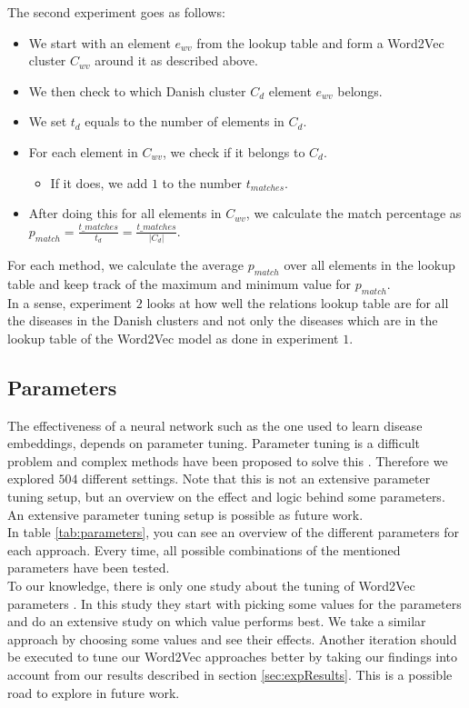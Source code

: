 \noindent The second experiment goes as follows:

\begin{itemize}

\item We start with an element $e_{wv}$ from the lookup table and form a Word2Vec cluster $C_{wv}$ around it as described above.
\item We then check to which Danish cluster $C_d$ element $e_{wv}$ belongs.
\item We set $t_{d}$ equals to the number of elements in $C_d$.
\item For each element in $C_{wv}$, we check if it belongs to $C_d$.
\begin{itemize}
\item If it does, we add $1$ to the number $t_{matches}$.
\end{itemize}
\item After doing this for all elements in $C_{wv}$, we calculate the match percentage as $p_{match} = \frac{t\_{matches}}{t_{d}} = \frac{t\_{matches}}{\left| C_{d} \right|}$.

\end{itemize}

For each method, we calculate the average $p_{match}$ over all elements in the lookup table and keep track of the maximum and minimum value for $p_{match}$. \\

In a sense, experiment $2$ looks at how well the relations lookup table are for all the diseases in the Danish clusters and not only the diseases which are in the lookup table of the Word2Vec model as done in experiment $1$.


\subsection{Parameters}
\label{sec:parameters}

The effectiveness of a neural network such as the one used to learn disease embeddings, depends on parameter tuning. Parameter tuning is a difficult problem and complex methods have been proposed to solve this \cite{tuning:article}. Therefore we explored $504$ different settings. Note that this is not an extensive parameter tuning setup, but an overview on the effect and logic behind some parameters. An extensive parameter tuning setup is possible as future work. \\

In table \ref{tab:parameters}, you can see an overview of the different parameters for each approach. Every time, all possible combinations of the mentioned parameters have been tested. \\
To our knowledge, there is only one study about the tuning of Word2Vec parameters \cite{w2vTuning:article}. In this study they start with picking some values for the parameters and do an extensive study on which value performs best. We take a similar approach by choosing some values and see their effects. Another iteration should be executed to tune our Word2Vec approaches better by taking our findings into account from our results described in section \ref{sec:expResults}. This is a possible road to explore in future work. \\

